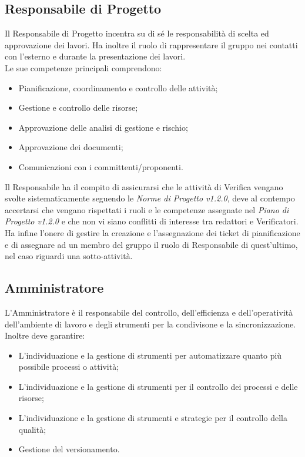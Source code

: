 \subsection{Responsabile di Progetto} %
\label{2.1}
Il Responsabile di Progetto incentra su di sé le responsabilità di scelta ed approvazione dei lavori. Ha inoltre il ruolo di rappresentare il gruppo nei contatti con l'esterno e durante la presentazione dei lavori.\\
Le sue competenze principali comprendono:
\begin{itemize}
\item Pianificazione, coordinamento e controllo delle attività;
\item Gestione e controllo delle risorse;
\item Approvazione delle analisi di gestione e rischio;
\item Approvazione dei documenti;
\item Comunicazioni con i committenti/proponenti.
\end{itemize}
Il Responsabile ha il compito di assicurarsi che le attività di Verifica vengano svolte sistematicamente seguendo le \emph{Norme di Progetto v1.2.0}, deve al contempo accertarsi che vengano rispettati i ruoli e le competenze assegnate nel \emph{Piano di Progetto v1.2.0} e che non vi siano conflitti di interesse tra redattori e Verificatori. Ha infine l'onere di gestire la creazione e l'assegnazione dei ticket di pianificazione e di assegnare ad un membro del gruppo il ruolo di Responsabile di quest'ultimo, nel caso riguardi una sotto-attività.

\subsection{Amministratore}
\label{2.2}
L'Amministratore è il responsabile del controllo, dell'efficienza e dell'operatività dell'ambiente di lavoro e degli strumenti per la condivisone e la sincronizzazione.\\
Inoltre deve garantire:
\begin{itemize}
\item L'individuazione e la gestione di strumenti per automatizzare quanto più possibile processi o attività;
\item L'individuazione e la gestione di strumenti per il controllo dei processi e delle risorse;
\item L'individuazione e la gestione di strumenti e strategie per il controllo della qualità;
\item Gestione del versionamento.
\end{itemize}

